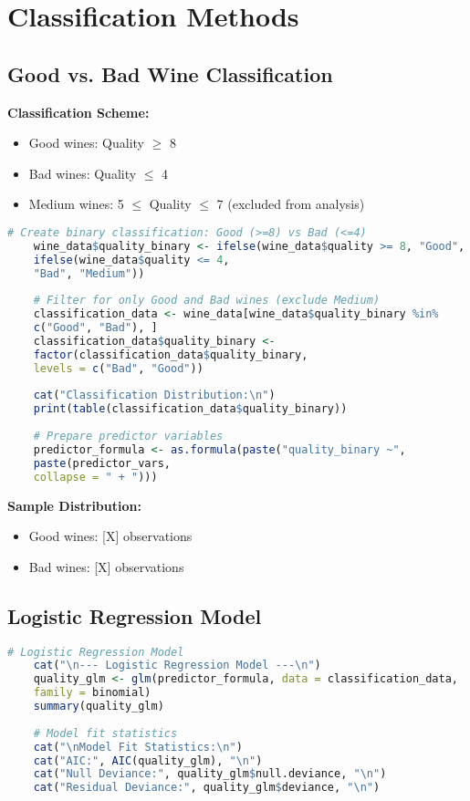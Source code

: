 \section{Classification Methods}

\subsection{Good vs. Bad Wine Classification}

\textbf{Classification Scheme:}
\begin{itemize}
	\item Good wines: Quality $\geq$ 8
	\item Bad wines: Quality $\leq$ 4
	\item Medium wines: 5 $\leq$ Quality $\leq$ 7 (excluded from analysis)
\end{itemize}

\begin{lstlisting}[language=R, caption=Binary Classification Setup, breaklines=true]
	# Create binary classification: Good (>=8) vs Bad (<=4)
	wine_data$quality_binary <- ifelse(wine_data$quality >= 8, "Good",
	ifelse(wine_data$quality <= 4, 
	"Bad", "Medium"))
	
	# Filter for only Good and Bad wines (exclude Medium)
	classification_data <- wine_data[wine_data$quality_binary %in% 
	c("Good", "Bad"), ]
	classification_data$quality_binary <- 
	factor(classification_data$quality_binary, 
	levels = c("Bad", "Good"))
	
	cat("Classification Distribution:\n")
	print(table(classification_data$quality_binary))
	
	# Prepare predictor variables
	predictor_formula <- as.formula(paste("quality_binary ~", 
	paste(predictor_vars, 
	collapse = " + ")))
\end{lstlisting}

\textbf{Sample Distribution:}
\begin{itemize}
	\item Good wines: [X] observations
	\item Bad wines: [X] observations
\end{itemize}

\subsection{Logistic Regression Model}

\begin{lstlisting}[language=R, caption=Logistic Regression for Quality Classification, breaklines=true]
	# Logistic Regression Model
	cat("\n--- Logistic Regression Model ---\n")
	quality_glm <- glm(predictor_formula, data = classification_data, 
	family = binomial)
	summary(quality_glm)
	
	# Model fit statistics
	cat("\nModel Fit Statistics:\n")
	cat("AIC:", AIC(quality_glm), "\n")
	cat("Null Deviance:", quality_glm$null.deviance, "\n")
	cat("Residual Deviance:", quality_glm$deviance, "\n")
\end{lstlisting}

